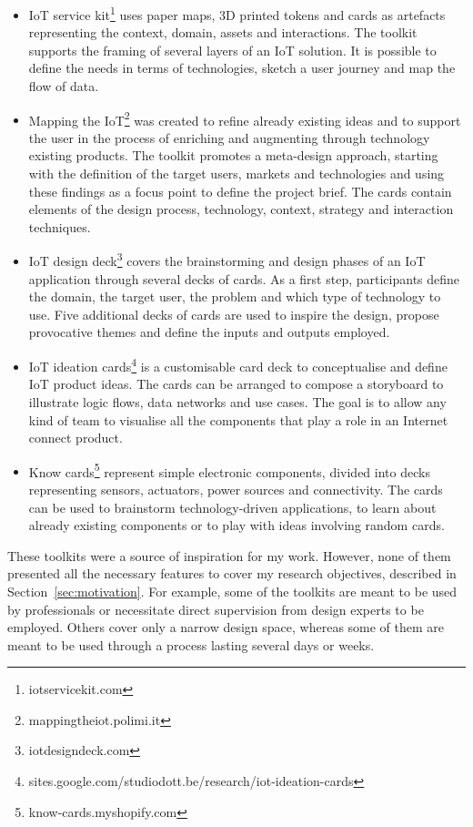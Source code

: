 \begin{itemize}
    \item IoT service kit\footnote{iotservicekit.com} uses paper maps, 3D printed tokens and cards as artefacts representing the context, domain, assets and interactions. The toolkit supports the framing of several layers of an IoT solution. It is possible to define the needs in terms of technologies, sketch a user journey and map the flow of data.
    \item Mapping the IoT\footnote{mappingtheiot.polimi.it} was created to refine already existing ideas and to support the user in the process of enriching and augmenting through technology existing products. The toolkit promotes a meta-design approach, starting with the definition of the target users, markets and technologies and using these findings as a focus point to define the project brief. The cards contain elements of the design process, technology, context, strategy and interaction techniques.
    \item IoT design deck\footnote{iotdesigndeck.com} covers the brainstorming and design phases of an IoT application through several decks of cards. As a first step, participants define the domain, the target user, the problem and which type of technology to use. Five additional decks of cards are used to inspire the design, propose provocative themes and define the inputs and outputs employed.
    \item IoT ideation cards\footnote{sites.google.com/studiodott.be/research/iot-ideation-cards} is a customisable card deck to conceptualise and define IoT product ideas. The cards can be arranged to compose a storyboard to illustrate logic flows, data networks and use cases. The goal is to allow any kind of team to visualise all the components that play a role in an Internet connect product.
    \item Know cards\footnote{know-cards.myshopify.com} represent simple electronic components, divided into decks representing sensors, actuators, power sources and connectivity. The cards can be used to brainstorm technology-driven applications, to learn about already existing components or to play with ideas involving random cards.
\end{itemize}

These toolkits were a source of inspiration for my work. However, none of them presented all the necessary features to cover my research objectives, described in Section~\ref{sec:motivation}. For example, some of the toolkits are meant to be used by professionals or necessitate direct supervision from design experts to be employed. Others cover only a narrow design space, whereas some of them are meant to be used through a process lasting several days or weeks.



